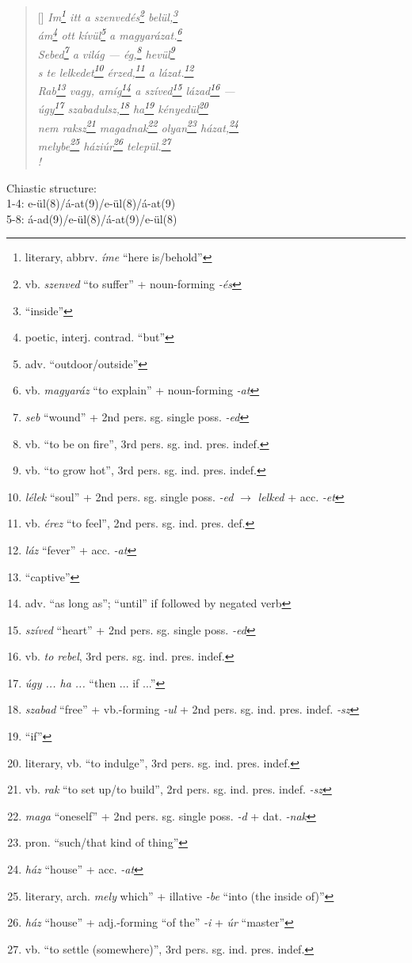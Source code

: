\documentclass[a4paper,12pt,twoside,final]{book}
\begin{document}
\begin{verse}[\versewidth]
  \it
  Im\footnote{literary, abbrv. \emph{íme} ``here is/behold''}
  itt a szenvedés\footnote{vb. \emph{szenved} ``to suffer''
  + noun-forming \emph{-és}} belül,\footnote{``inside''} \\
  ám\footnote{poetic, interj. contrad. ``but''} ott
  kívül\footnote{adv. ``outdoor/outside''} a
  magyarázat.\footnote{vb. \emph{magyaráz} ``to explain'' +
  noun-forming \emph{-at}} \\
  Sebed\footnote{\emph{seb} ``wound'' + 2nd
  pers. sg. single poss. \emph{-ed}} a világ --- ég,\footnote{vb.
  ``to be on fire'', 3rd pers. sg. ind. pres. indef.}
  hevül\footnote{vb. ``to grow hot'', 3rd
  pers. sg. ind. pres. indef.} \\
  s te lelkedet\footnote{\emph{lélek} ``soul'' + 2nd
  pers. sg. single poss. \emph{-ed} $\rightarrow$ \emph{lelked} +
  acc. \emph{-et}} érzed,\footnote{vb. \emph{érez} ``to feel'', 2nd
  pers. sg. ind. pres. def.} a lázat.\footnote{\emph{láz} ``fever'' +
  acc. \emph{-at}} \\
  Rab\footnote{``captive''} vagy, amíg\footnote{adv. ``as long as'';
  ``until'' if followed by negated verb} a
  szíved\footnote{\emph{szíved} ``heart'' + 2nd pers. sg. single
  poss. \emph{-ed}} lázad\footnote{vb. \emph{to rebel}, 3rd
  pers. sg. ind. pres. indef.} --- \\
  úgy\footnote{\emph{úgy ... ha ...} ``then ... if ...''}
  szabadulsz,\footnote{\emph{szabad} ``free'' + vb.-forming \emph{-ul}
  + 2nd pers. sg. ind. pres. indef. \emph{-sz}} ha\footnote{``if''}
  kényedül\footnote{literary, vb. ``to indulge'', 3rd
  pers. sg. ind. pres. indef.} \\
  nem raksz\footnote{vb. \emph{rak} ``to set up/to build'', 2rd
  pers. sg. ind. pres. indef. \emph{-sz}}
  magadnak\footnote{\emph{maga} ``oneself'' + 2nd pers. sg. single
  poss. \emph{-d} + dat. \emph{-nak}}
  olyan\footnote{pron. ``such/that kind of thing''}
  házat,\footnote{\emph{ház} ``house'' + acc. \emph{-at}} \\
  melybe\footnote{literary, arch. \emph{mely}
   which'' + illative \emph{-be} ``into (the inside of)''}
  háziúr\footnote{\emph{ház} ``house'' + adj.-forming ``of the''
  \emph{-i} + \emph{úr} ``master''} települ.\footnote{vb. ``to
  settle (somewhere)'', 3rd pers. sg. ind. pres. indef.} \\!
\end{verse}

\noindent Chiastic structure: \\
1-4: e-ül(8)/á-at(9)/e-ül(8)/á-at(9) \\
5-8: á-ad(9)/e-ül(8)/á-at(9)/e-ül(8)
\end{document}
